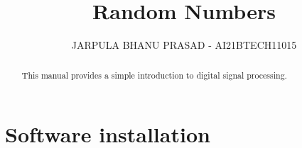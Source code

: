 \documentclass[journal,12pt,twocolumn]{IEEEtran}
\renewcommand\thesection{\arabic{section}}
\begin{document}
\let\StandardTheFigure\thefigure
\renewcommand{\thefigure}{\thesection}



\makeatletter
{}
\makeatother

\let\StandardTheFigure\thefigure
\let\StandardTheTable\thetable
\let\vec\mathbf
{}

\vspace{3cm}


\title{%
	Random Numbers
}

%
%
%

\author{JARPULA BHANU PRASAD - AI21BTECH11015}
\maketitle

\tableofcontents

\bigskip

\renewcommand{\thefigure}{\theenumi}
\renewcommand{\thetable}{\theenumi}

\begin{abstract}
This manual provides a simple introduction to digital signal processing.
\end{abstract}
\section{Software installation}
\end{document}
